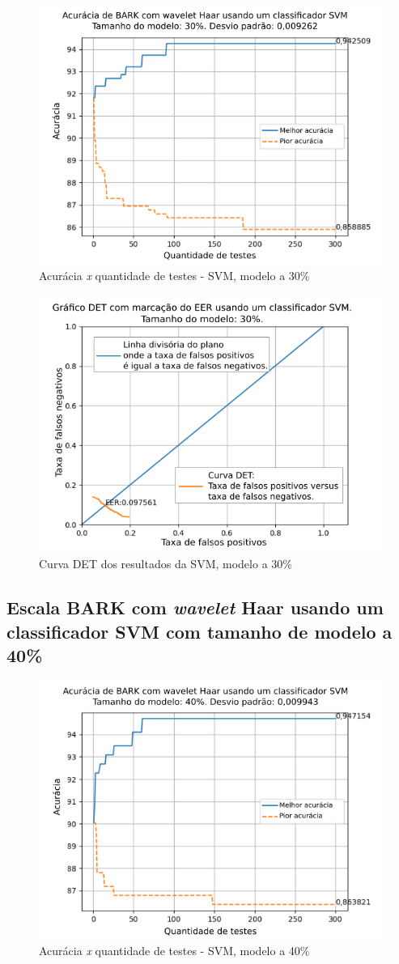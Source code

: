 			\begin{figure}[ht]
				\centering
				\includegraphics[width=.6\linewidth]{images/results/confusionMatrices/classifier_SVM_30.png}
				\caption{Acurácia \textit{x} quantidade de testes - SVM, modelo a 30\%}
				\label{fig:classifiersvm30}
			\end{figure}
		
			\begin{figure}[H]
				\centering
				\includegraphics[width=.6\linewidth]{images/results/det/DET_SVM_30}
				\caption{Curva DET dos resultados da SVM, modelo a 30\%}
				\label{fig:detsvm30}
			\end{figure}
	
			\FloatBarrier
		\subsection{Escala BARK com \textit{wavelet} Haar usando um classificador SVM com tamanho de modelo a 40\%}
			
			
			\begin{figure}[ht]
				\centering
				\includegraphics[width=.6\linewidth]{images/results/confusionMatrices/classifier_SVM_40.png}
				\caption{Acurácia \textit{x} quantidade de testes - SVM, modelo a 40\%}
				\label{fig:classifiersvm40}
			\end{figure}
		
